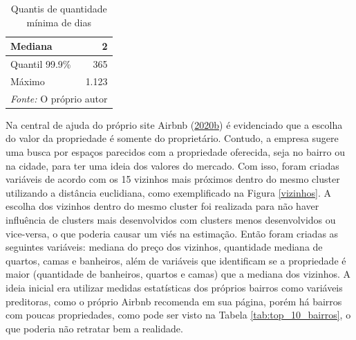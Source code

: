 \documentclass[
	12pt,				%
	a4paper,		%
	oneside,    %
	chapter=TITLE,		   %
	section=TITLE,		   %
	subsection=TITLE,	   %
	subsubsection=TITLE, %
	english,			%
	french,				%
	spanish,			%
	brazil,				%
]{abntex2}
\begin{document}
\begin{table}

\caption{\label{tab:minimum_nights}Quantis de quantidade mínima de dias}
\centering
\begin{tabular}[t]{l|r}
\hline
Mediana & 2\\
\hline
Quantil 99.9\% & 365\\
\hline
Máximo & 1.123\\
\hline
\multicolumn{2}{l}{\textit{Fonte: } O próprio autor}\\
\end{tabular}
\end{table}

Na central de ajuda do próprio site Airbnb
(\protect\hyperlink{ref-precoairbnb}{2020}\protect\hyperlink{ref-precoairbnb}{b})
é evidenciado que a escolha do valor da propriedade é somente do
proprietário. Contudo, a empresa sugere uma busca por espaços parecidos
com a propriedade oferecida, seja no bairro ou na cidade, para ter uma
ideia dos valores do mercado. Com isso, foram criadas variáveis de
acordo com os 15 vizinhos mais próximos dentro do mesmo cluster
utilizando a distância euclidiana, como exemplificado na Figura
\ref{vizinhos}. A escolha dos vizinhos dentro do mesmo cluster foi
realizada para não haver influência de clusters mais desenvolvidos com
clusters menos desenvolvidos ou vice-versa, o que poderia causar um viés
na estimação. Então foram criadas as seguintes variáveis: mediana do
preço dos vizinhos, quantidade mediana de quartos, camas e banheiros,
além de variáveis que identificam se a propriedade é maior (quantidade
de banheiros, quartos e camas) que a mediana dos vizinhos. A ideia
inicial era utilizar medidas estatísticas dos próprios bairros como
variáveis preditoras, como o próprio Airbnb recomenda em sua página,
porém há bairros com poucas propriedades, como pode ser visto na Tabela
\ref{tab:top_10_bairros}, o que poderia não retratar bem a realidade.
\end{document}
